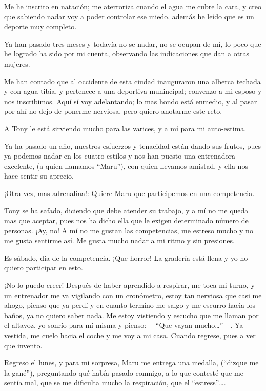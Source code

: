 \documentclass[letterpaper, 12pt]{book}
\begin{document}
Me he inscrito en natación; me aterroriza cuando el agua me cubre la cara, y creo que sabiendo nadar voy a poder controlar ese miedo, además he leído que es un deporte muy completo.

Ya han pasado tres meses y todavía no se nadar, no se ocupan de mí, lo poco que he logrado ha sido por mi cuenta, observando las indicaciones que dan a otras mujeres.

Me han contado que al occidente de esta ciudad inauguraron una alberca techada y con agua tibia, y pertenece a una deportiva munincipal; convenzo a mi esposo y nos inscribimos. Aquí sí voy adelantando; lo mas hondo está enmedio, y al pasar por ahí no dejo de ponerme nerviosa, pero quiero anotarme este reto.

A Tony le está sirviendo mucho para las varices, y a mí para mi auto-estima.

Ya ha pasado un año, nuestros esfuerzos y tenacidad están dando sus frutos, pues ya podemos nadar en los cuatro estilos y nos han puesto una entrenadora excelente, (a quien llamamos ``Maru''), con quien llevamos amistad, y ella nos hace sentir su aprecio.

¡Otra vez, mas adrenalina!: Quiere Maru que participemos en una competencia.

Tony se ha safado, diciendo que debe atender su trabajo, y a mí no me queda mas que aceptar, pues nos ha dicho ella que le exigen determinado número de personas. ¡Ay, no! A mí no me gustan las competencias, me estreso mucho y no me gusta sentirme así. Me gusta mucho nadar a mi ritmo y sin presiones.

Es sábado, día de la competencia. ¡Que horror! La gradería está llena y yo no quiero participar en esto. 

¡No lo puedo creer! Después de haber aprendido a respirar, me toca mi turno, y un entrenador me va vigilando con un cronómetro, estoy tan nerviosa que casi me ahogo, pienso que ya perdí y en cuanto termino me salgo y me escurro hacia los baños, ya no quiero saber nada. Me estoy vistiendo y escucho que me llaman por el altavoz, yo  sonrío para mí misma y pienso: ---``Que vayan mucho\ldots''---.  Ya vestida, me cuelo hacia el coche y me voy a mi casa. Cuando regrese, pues a ver que invento.

Regreso el lunes, y para mi sorpresa, Maru me entrega una medalla, (``dizque me la gané''), preguntando qué había pasado conmigo, a lo que contesté que me sentía mal, que se me dificulta mucho la respiración, que el ``estress''\ldots.
\end{document}

